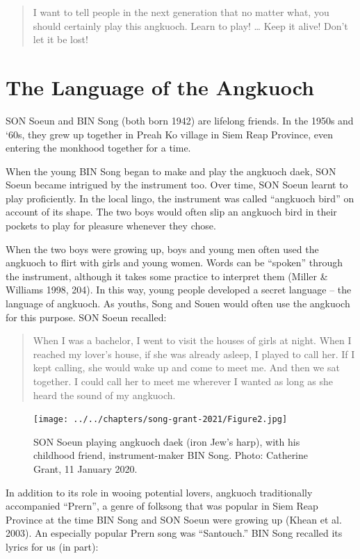 \documentclass[twoside]{article}
\begin{document}
\begin{quote}
I want to tell people in the next generation that no matter what, you
should certainly play this angkuoch. Learn to play! \ldots{} Keep it
alive! Don't let it be lost!
\end{quote}

\hypertarget{the-language-of-the-angkuoch}{%
\section*{The Language of the
Angkuoch}\label{the-language-of-the-angkuoch}}

SON Soeun and BIN Song (both born 1942) are lifelong friends. In the
1950s and `60s, they grew up together in Preah Ko village in Siem Reap
Province, even entering the monkhood together for a time.

When the young BIN Song began to make and play the angkuoch daek, SON
Soeun became intrigued by the instrument too. Over time, SON Soeun
learnt to play proficiently. In the local lingo, the instrument was
called ``angkuoch bird'' on account of its shape. The two boys would
often slip an angkuoch bird in their pockets to play for pleasure
whenever they chose.

When the two boys were growing up, boys and young men often used the
angkuoch to flirt with girls and young women. Words can be ``spoken''
through the instrument, although it takes some practice to interpret
them (Miller \& Williams 1998, 204). In this way, young people developed
a secret language -- the language of angkuoch. As youths, Song and Souen
would often use the angkuoch for this purpose. SON Soeun recalled:

\begin{quote}
When I was a bachelor, I went to visit the houses of girls at night.
When I reached my lover's house, if she was already asleep, I played to
call her. If I kept calling, she would wake up and come to meet me. And
then we sat together. I could call her to meet me wherever I wanted as
long as she heard the sound of my angkuoch.
\end{quote}

\begin{figure}[ht]
  \texttt{[image: ../../chapters/song-grant-2021/Figure2.jpg]}
  \caption{SON Soeun playing angkuoch
  daek (iron Jew's harp), with his childhood friend, instrument-maker BIN
  Song. Photo: Catherine Grant, 11 January 2020.}
\end{figure}

In addition to its role in wooing potential lovers, angkuoch
traditionally accompanied ``Prern'', a genre of folksong that was
popular in Siem Reap Province at the time BIN Song and SON Soeun were
growing up (Khean et al. 2003). An especially popular Prern song was
``Santouch.'' BIN Song recalled its lyrics for us (in part):
\end{document}
